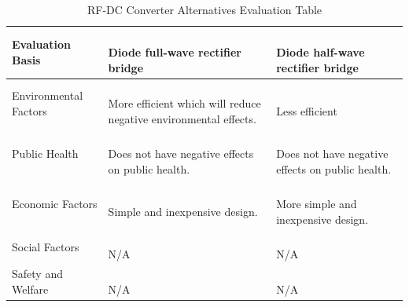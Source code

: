 \documentclass[12pt]{article}
\begin{document}
\begin{table}[h!]
\centering
\caption{RF-DC Converter Alternatives Evaluation Table}
\begin{tabular}{| l | l | l |}
\hline
\parbox{0.17\linewidth}{\centering Evaluation Basis} & \parbox{0.240\linewidth}{\centering \hfill \\
Diode full-wave rectifier bridge
\\} & \parbox{0.240\linewidth}{\centering \hfill \\
Diode half-wave rectifier bridge
\\}\\
\hline
\parbox{0.17\linewidth}{\raggedleft Environmental Factors} &
\parbox{0.240\linewidth}{\hfill \\
More efficient which will reduce negative environmental effects.
\\} & \parbox{0.240\linewidth}{\hfill \\
Less efficient
\\}\\ \hline
\parbox{0.17\linewidth}{\raggedleft Public Health} & 
\parbox{0.240\linewidth}{\hfill \\
Does not have negative effects on public health.
\\} & \parbox{0.240\linewidth}{\hfill \\
Does not have negative effects on public health.
\\}\\ \hline
\parbox{0.17\linewidth}{\raggedleft Economic Factors} &
\parbox{0.240\linewidth}{\hfill \\
Simple and inexpensive design.
\\} & \parbox{0.240\linewidth}{\hfill \\
More simple and inexpensive design.
\\}\\ \hline
\parbox{0.17\linewidth}{\raggedleft Social Factors} & 
\parbox{0.240\linewidth}{\hfill \\
N/A
\\} & \parbox{0.240\linewidth}{\hfill \\
N/A
\\}\\ \hline
\parbox{0.17\linewidth}{\raggedleft Safety and Welfare} & 
\parbox{0.240\linewidth}{\hfill \\
N/A
\\} & \parbox{0.240\linewidth}{\hfill \\
N/A
\\}\\ \hline

\end{tabular}
\end{table}
\end{document}
